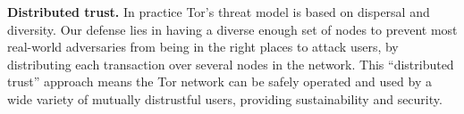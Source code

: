\documentclass{llncs}
\begin{document}
%



\medskip
\noindent
{\bf Distributed trust.}
In practice Tor's threat model is based on
dispersal and diversity.
Our defense lies in having a diverse enough set of nodes
to prevent most real-world
adversaries from being in the right places to attack users,
by distributing each transaction
over several nodes in the network.  This ``distributed trust'' approach
means the Tor network can be safely operated and used by a wide variety
of mutually distrustful users, providing sustainability and security.
\end{document}
